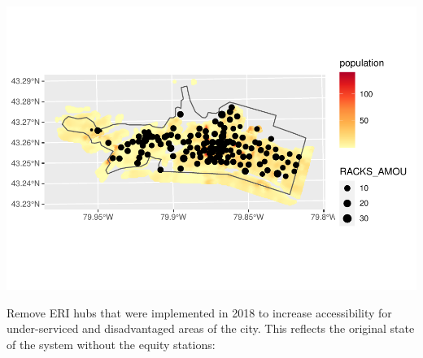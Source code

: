 \documentclass[
]{article}
\begin{document}
\includegraphics{00-Data-Processing-Example_files/figure-latex/unnamed-chunk-89-1.pdf}

Remove ERI hubs that were implemented in 2018 to increase accessibility
for under-serviced and disadvantaged areas of the city. This reflects
the original state of the system without the equity stations:
\end{document}
